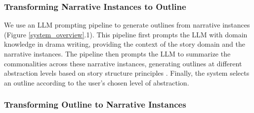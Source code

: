 \subsubsection{Transforming Narrative Instances to Outline} \label{summarizer}
We use an LLM prompting pipeline to generate outlines from narrative instances (Figure \ref{system_overview}.1). This pipeline first prompts the LLM with domain knowledge in drama writing, providing the context of the story domain and the narrative instances. The pipeline then prompts the LLM to summarize the commonalities across these narrative instances, generating outlines at different abstraction levels based on story structure principles \cite{mckee1997story}. Finally, the system selects an outline according to the user's chosen level of abstraction.

\subsubsection{Transforming Outline to Narrative Instances} \label{compiler}



